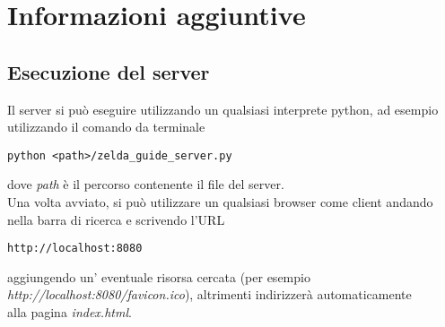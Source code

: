 \documentclass[a4paper,12pt]{report}
\begin{document}
\chapter{Informazioni aggiuntive}
\section{Esecuzione del server}
Il server si può eseguire utilizzando un qualsiasi interprete python, ad esempio utilizzando il comando da terminale
\begin{verbatim}
python <path>/zelda_guide_server.py
\end{verbatim}
dove \textit{path} è il percorso contenente il file del server.
\\Una volta avviato, si può utilizzare un qualsiasi browser come client andando nella barra di ricerca e scrivendo l'URL
\begin{verbatim}
http://localhost:8080
\end{verbatim}
aggiungendo un' eventuale risorsa cercata (per esempio \\\textit{http://localhost:8080/favicon.ico}), altrimenti indirizzerà automaticamente \\alla pagina \textit{index.html}.
\end{document}

